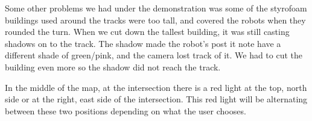 Some other problems we had under the demonstration was some of the styrofoam buildings used around the tracks were too tall, and covered the robots when they rounded the turn. When we cut down the tallest building, it was still casting shadows on to the track. The shadow made the robot's post it note have a different shade of green/pink, and the camera lost track of it. We had to cut the building even more so the shadow did not reach the track.

In the middle of the map, at the intersection there is a red light at the top, north side or at the right, east side of the intersection. This red light will be alternating between these two positions depending on what the user chooses. 
\begin{figure}
    \centering
    \hfill
    \hfill

\end{figure}
